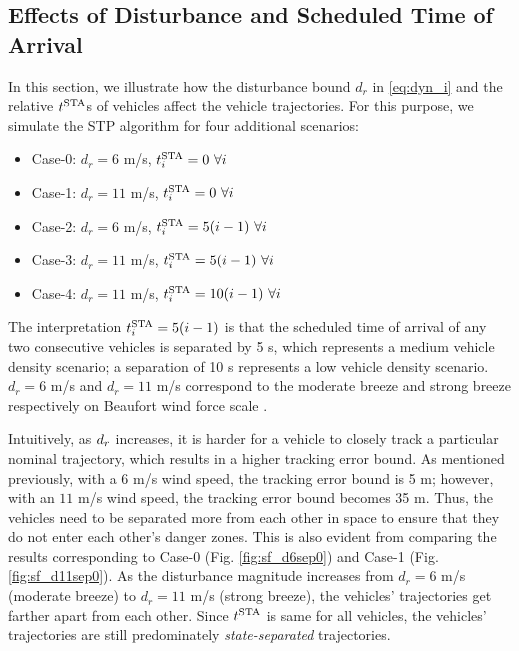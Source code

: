 \subsection{Effects of Disturbance and Scheduled Time of Arrival \label{sec:city_distbEffect}}
In this section, we illustrate how the disturbance bound $d_r$ in \eqref{eq:dyn_i} and the relative $t^\text{STA}$s of vehicles affect the vehicle trajectories. For this purpose, we simulate the STP algorithm for four additional scenarios:
\begin{itemize}
\item Case-0: $d_r = 6$ m/s, $t^\text{STA}_i = 0 ~\forall i$
\item Case-1: $d_r = 11$ m/s, $t^\text{STA}_i = 0 ~\forall i$
\item Case-2: $d_r = 6$ m/s, $t^\text{STA}_i = 5(i-1) ~\forall i$
\item Case-3: $d_r = 11$ m/s, $t^\text{STA}_i = 5(i-1) ~\forall i$
\item Case-4: $d_r = 11$ m/s, $t^\text{STA}_i = 10(i-1) ~\forall i$
\end{itemize}
The interpretation $t^\text{STA}_i = 5(i-1)$ is that the scheduled time of arrival of any two consecutive vehicles is separated by 5 s, which represents a medium vehicle density scenario; a separation of 10 s represents a low vehicle density scenario. $d_r = 6$ m/s and $d_r = 11$ m/s correspond to the moderate breeze and strong breeze respectively on Beaufort wind force scale \cite{Windscale}. 

Intuitively, as $d_r$ increases, it is harder for a vehicle to closely track a particular nominal trajectory, which results in a higher tracking error bound. As mentioned previously, with a $6$ m/s wind speed, the tracking error bound is 5 m; however, with an $11$ m/s wind speed, the tracking error bound becomes 35 m. Thus, the vehicles need to be separated more from each other in space to ensure that they do not enter each other's danger zones. This is also evident from comparing the results corresponding to Case-0 (Fig. \ref{fig:sf_d6sep0}) and Case-1 (Fig. \ref{fig:sf_d11sep0}). As the disturbance magnitude increases from $d_r = 6$ m/s (moderate breeze) to $d_r = 11$ m/s (strong breeze), the vehicles' trajectories get farther apart from each other. Since $t^\text{STA}$ is same for all vehicles, the vehicles’ trajectories are still predominately \textit{state-separated} trajectories.


